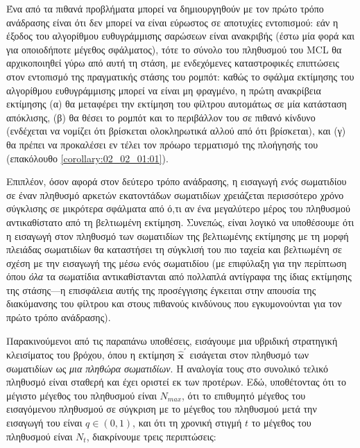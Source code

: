 Ένα από τα πιθανά προβλήματα μπορεί να δημιουργηθούν με τον πρώτο τρόπο
ανάδρασης είναι ότι δεν μπορεί να είναι εύρωστος σε αποτυχίες εντοπισμού: εάν η
έξοδος του αλγορίθμου ευθυγράμμισης σαρώσεων είναι ανακριβής (έστω μία φορά και
για οποιοδήποτε μέγεθος σφάλματος), τότε το σύνολο του πληθυσμού του MCL θα
αρχικοποιηθεί γύρω από αυτή τη στάση, με ενδεχόμενες καταστροφικές επιπτώσεις
στον εντοπισμό της πραγματικής στάσης του ρομπότ: καθώς το σφάλμα εκτίμησης του
αλγορίθμου ευθυγράμμισης μπορεί να είναι μη φραγμένο, η πρώτη ανακρίβεια
εκτίμησης (α) θα μεταφέρει την εκτίμηση του φίλτρου αυτομάτως σε μία κατάσταση
απόκλισης, (β) θα θέσει το ρομπότ και το περιβάλλον του σε πιθανό κίνδυνο
(ενδέχεται να νομίζει ότι βρίσκεται ολοκληρωτικά αλλού από ότι βρίσκεται), και
(γ) θα πρέπει να προκαλέσει εν τέλει τον πρόωρο τερματισμό της πλοήγησής του
(επακόλουθο \ref{corollary:02_02_01:01}).

Επιπλέον, όσον αφορά στον δεύτερο τρόπο ανάδρασης, η εισαγωγή \textit{ενός}
σωματιδίου σε έναν πληθυσμό αρκετών εκατοντάδων σωματιδίων χρειάζεται
περισσότερο χρόνο σύγκλισης σε μικρότερα σφάλματα από ό,τι αν ένα μεγαλύτερο
μέρος του πληθυσμού αντικαθίστατο από τη βελτιωμένη εκτίμηση.  Συνεπώς, είναι
λογικό να υποθέσουμε ότι η εισαγωγή στον πληθυσμό των σωματιδίων της
βελτιωμένης εκτίμησης με τη μορφή πλειάδας σωματιδίων θα καταστήσει τη σύγκλισή
του πιο ταχεία και βελτιωμένη σε σχέση με την εισαγωγή της μέσω ενός
σωματιδίου (με επιφύλαξη για την περίπτωση όπου \textit{όλα} τα σωματίδια
αντικαθίστανται από πολλαπλά αντίγραφα της ίδιας εκτίμησης της στάσης---η
επισφάλεια αυτής της προσέγγισης έγκειται στην απουσία της διακύμανσης του
φίλτρου και στους πιθανούς κινδύνους που εγκυμονούνται για τον πρώτο τρόπο
ανάδρασης).

Παρακινούμενοι από τις παραπάνω υποθέσεις, εισάγουμε μια υβριδική στρατηγική
κλεισίματος του βρόχου, όπου η εκτίμηση $\hat{\bm{x}}^{\prime}$ εισάγεται στον
πληθυσμό των σωματιδίων ως \textit{μια πληθώρα σωματιδίων}. Η αναλογία τους στο
συνολικό τελικό πληθυσμό είναι σταθερή και έχει οριστεί εκ των προτέρων. Εδώ,
υποθέτοντας ότι το μέγιστο μέγεθος του πληθυσμού είναι $N_{max}$, ότι το
επιθυμητό μέγεθος του εισαγόμενου πληθυσμού σε σύγκριση με το μέγεθος του
πληθυσμού μετά την εισαγωγή του είναι $q \in (0,1)$, και ότι τη χρονική στιγμή
$t$ το μέγεθος του πληθυσμού είναι $N_t$, διακρίνουμε τρεις περιπτώσεις:

